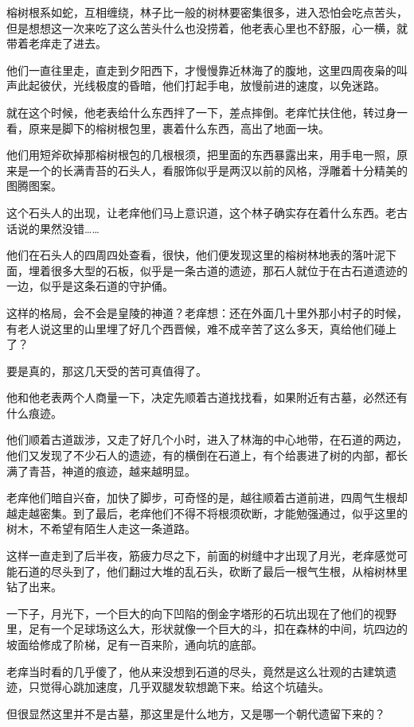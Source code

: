 榕树根系如蛇，互相缠绕，林子比一般的树林要密集很多，进入恐怕会吃点苦头，但是想想这一次来吃了这么苦头什么也没捞着，他老表心里也不舒服，心一横，就带着老痒走了进去。

他们一直往里走，直走到夕阳西下，才慢慢靠近林海了的腹地，这里四周夜枭的叫声此起彼伏，光线极度的昏暗，他们打起手电，放慢前进的速度，以免迷路。

就在这个时候，他老表给什么东西拌了一下，差点摔倒。老痒忙扶住他，转过身一看，原来是脚下的榕树根包里，裹着什么东西，高出了地面一块。

他们用短斧砍掉那榕树根包的几根根须，把里面的东西暴露出来，用手电一照，原来是一个的长满青苔的石头人，看服饰似乎是两汉以前的风格，浮雕着十分精美的图腾图案。

这个石头人的出现，让老痒他们马上意识道，这个林子确实存在着什么东西。老古话说的果然没错……

他们在石头人的四周四处查看，很快，他们便发现这里的榕树林地表的落叶泥下面，埋着很多大型的石板，似乎是一条古道的遗迹，那石人就位于在古石道遗迹的一边，似乎是这条石道的守护俑。

这样的格局，会不会是皇陵的神道？老痒想：还在外面几十里外那小村子的时候，有老人说这里的山里埋了好几个西晋候，难不成辛苦了这么多天，真给他们碰上了？

要是真的，那这几天受的苦可真值得了。

他和他老表两个人商量一下，决定先顺着古道找找看，如果附近有古墓，必然还有什么痕迹。

他们顺着古道跋涉，又走了好几个小时，进入了林海的中心地带，在石道的两边，他们又发现了不少石人的遗迹，有的横倒在石道上，有个给裹进了树的内部，都长满了青苔，神道的痕迹，越来越明显。

老痒他们暗自兴奋，加快了脚步，可奇怪的是，越往顺着古道前进，四周气生根却越走越密集。到了最后，老痒他们不得不将根须砍断，才能勉强通过，似乎这里的树木，不希望有陌生人走这一条道路。

这样一直走到了后半夜，筋疲力尽之下，前面的树缝中才出现了月光，老痒感觉可能石道的尽头到了，他们翻过大堆的乱石头，砍断了最后一根气生根，从榕树林里钻了出来。

一下子，月光下，一个巨大的向下凹陷的倒金字塔形的石坑出现在了他们的视野里，足有一个足球场这么大，形状就像一个巨大的斗，扣在森林的中间，坑四边的坡面给修成了阶梯，足有一百来阶，通向坑的底部。

老痒当时看的几乎傻了，他从来没想到石道的尽头，竟然是这么壮观的古建筑遗迹，只觉得心跳加速度，几乎双腿发软想跪下来。给这个坑磕头。

但很显然这里并不是古墓，那这里是什么地方，又是哪一个朝代遗留下来的？

